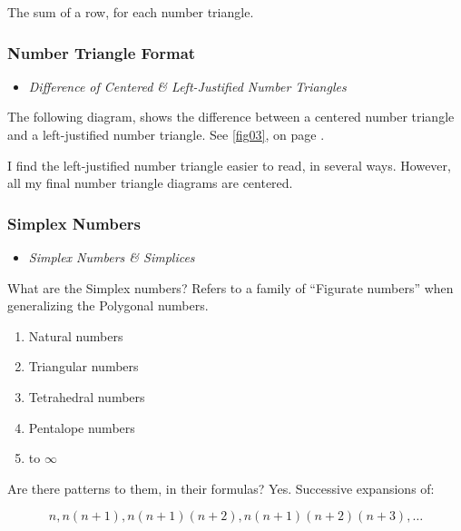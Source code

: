 \documentclass[12pt]{article}
\begin{document}
        The sum of a row, for each number triangle.
        
        \subsubsection{Number Triangle Format}
        \label{secb:11}
        
        \begin{itemize}
            \item \textit{Difference of Centered \& Left-Justified Number Triangles}
        \end{itemize}
        
        The following diagram, shows the difference between a centered number triangle and a 
        left-justified number triangle. See \cref{fig03},  on page \pageref{fig03}.
        
        I find the left-justified number triangle easier to read, in several ways. However, all 
        my final number triangle diagrams are centered.
        
        \subsubsection{Simplex Numbers}
        \label{secb:12}
        
        \begin{itemize}
            \item \textit{Simplex Numbers \& Simplices}
        \end{itemize}
        
        What are the Simplex numbers? Refers to a family of ``Figurate numbers'' when 
        generalizing the Polygonal numbers.
        
        \begin{enumerate}
            \item Natural numbers
            \item Triangular numbers
            \item Tetrahedral numbers
            \item Pentalope numbers
            \item to $ \infty $
        \end{enumerate}
        
        Are there patterns to them, in their formulas? Yes. Successive expansions of:
        
        \begin{equation}
            \label{eq1:4}
            n,n(n + 1),n(n + 1)(n + 2),n(n + 1)(n + 2)(n + 3), \ldots
        \end{equation}
        
\end{document}
